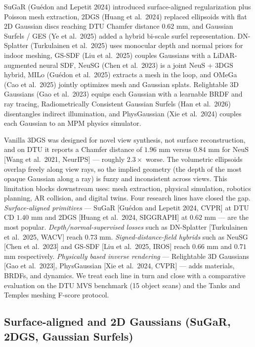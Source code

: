 SuGaR (Guédon and Lepetit 2024) introduced surface-aligned regularization plus Poisson mesh extraction, 2DGS (Huang et al.~2024) replaced ellipsoids with flat 2D Gaussian discs reaching DTU Chamfer distance \(0.62\) mm, and Gaussian Surfels / GES (Ye et al.~2025) added a hybrid bi-scale surfel representation. DN-Splatter (Turkulainen et al.~2025) uses monocular depth and normal priors for indoor meshing, GS-SDF (Liu et al.~2025) couples Gaussians with a LiDAR-augmented neural SDF, NeuSG (Chen et al.~2023) is a joint NeuS + 3DGS hybrid, MILo (Guédon et al.~2025) extracts a mesh in the loop, and OMeGa (Cao et al.~2025) jointly optimizes mesh and Gaussian splats. Relightable 3D Gaussians (Gao et al.~2023) equips each Gaussian with a learnable BRDF and ray tracing, Radiometrically Consistent Gaussian Surfels (Han et al.~2026) disentangles indirect illumination, and PhysGaussian (Xie et al.~2024) couples each Gaussian to an MPM physics simulator.

Vanilla 3DGS was designed for novel view synthesis, not surface reconstruction, and on DTU it reports a Chamfer distance of \(1.96\) mm versus \(0.84\) mm for NeuS {[}Wang et al.~2021, NeurIPS{]} --- roughly \(2.3\times\) worse. The volumetric ellipsoids overlap freely along view rays, so the implied geometry (the depth of the most opaque Gaussian along a ray) is fuzzy and inconsistent across views. This limitation blocks downstream uses: mesh extraction, physical simulation, robotics planning, AR collision, and digital twins. Four research lines have closed the gap. \emph{Surface-aligned primitives} --- SuGaR {[}Guédon and Lepetit 2024, CVPR{]} at DTU CD \(1.40\) mm and 2DGS {[}Huang et al.~2024, SIGGRAPH{]} at \(0.62\) mm --- are the most popular. \emph{Depth/normal-supervised losses} such as DN-Splatter {[}Turkulainen et al.~2025, WACV{]} reach \(0.73\) mm. \emph{Signed-distance-field hybrids} such as NeuSG {[}Chen et al.~2023{]} and GS-SDF {[}Liu et al.~2025, IROS{]} reach \(0.66\) mm and \(0.71\) mm respectively. \emph{Physically based inverse rendering} --- Relightable 3D Gaussians {[}Gao et al.~2023{]}, PhysGaussian {[}Xie et al.~2024, CVPR{]} --- adds materials, BRDFs, and dynamics. We treat each line in turn and close with a comparative evaluation on the DTU MVS benchmark (15 object scans) and the Tanks and Temples meshing F-score protocol.

\subsection{Surface-aligned and 2D Gaussians (SuGaR, 2DGS, Gaussian Surfels)}\label{surface-aligned-and-2d-gaussians-sugar-2dgs-gaussian-surfels}

